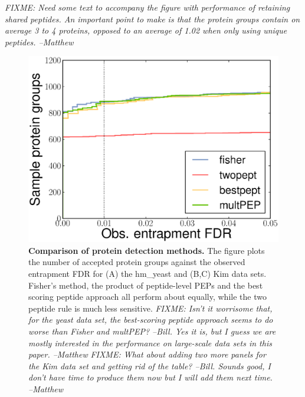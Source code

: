 \documentclass{article}
\begin{document}
{\em FIXME: Need some text to accompany the figure with performance 
of retaining shared peptides. An important point to make is that the 
protein groups contain on average 3 to 4 proteins, opposed to an 
average of 1.02 when only using unique peptides. --Matthew}

\begin{figure}
  \centering
  \includegraphics[width=0.45\linewidth]{./img/unique-pept-performance}
  \caption{{\bf Comparison of protein detection methods.}  The figure
    plots the number of accepted protein groups against the observed
    entrapment FDR for (A) the hm\_yeast and (B,C) Kim data
    sets. Fisher's method, the product of peptide-level PEPs and the
    best scoring peptide approach all perform about equally, while the
    two peptide rule is much less sensitive.  {\em FIXME: Isn't it
      worrisome that, for the yeast data set, the best-scoring peptide
      approach seems to do worse than Fisher and multPEP? --Bill. 
      Yes it is, but I guess we are mostly interested in the 
      performance on large-scale data sets in this paper. --Matthew} 
      {\em FIXME: What about adding two more panels for the Kim data 
      set and getting rid of the table?  --Bill. Sounds good, I 
      don't have time to produce them now but I will add them next 
      time. --Matthew}}
  \label{fig:power}
\end{figure}
\end{document}
